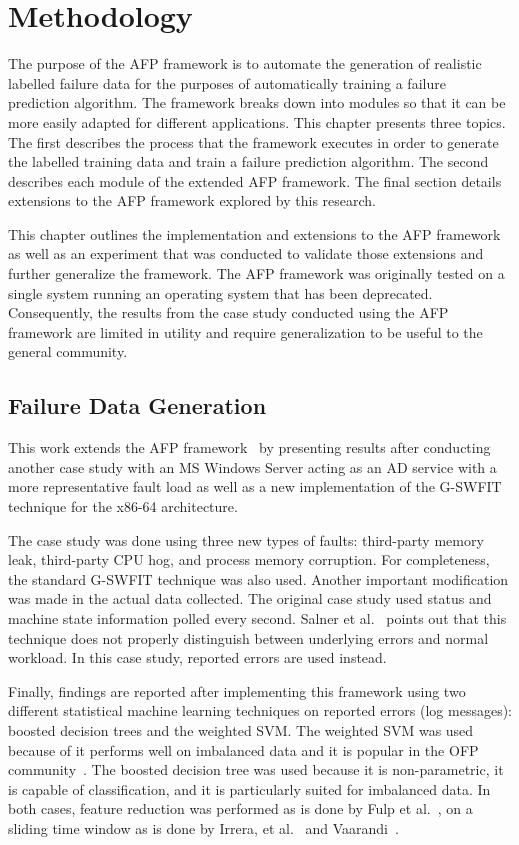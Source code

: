 \chapter{Methodology} \label{chapter3}
The purpose of the \ac{AFP} framework is to automate the generation of
realistic labelled failure data for the purposes of automatically training a
failure prediction algorithm.  The framework breaks down into modules so that
it can be more easily adapted for different applications.  This chapter
presents three topics.  The first describes the process that the framework
executes in order to generate the labelled training data and train a failure
prediction algorithm.  The second describes each module of the extended
\ac{AFP} framework.  The final section details extensions to the \ac{AFP}
framework explored by this research.

This chapter outlines the implementation and extensions to the \ac{AFP}
framework~\cite{irrera2015} as well as an experiment that was conducted to
validate those extensions and further generalize the framework.  The \ac{AFP}
framework was originally tested on a single system running an operating system
that has been deprecated.  Consequently, the results from the case study
conducted using the \ac{AFP} framework are limited in utility and require
generalization to be useful to the general community.

\section{Failure Data Generation} \label{sec:generation}
This work extends the \ac{AFP} framework~\cite{irrera2015} by presenting
results after conducting another case study with an \ac{MS} Windows Server
acting as an \ac{AD} service with a more representative fault load as well as a
new implementation of the \ac{G-SWFIT} technique for the x86-64 architecture.

The case study was done using three new types of faults: third-party memory
leak, third-party \ac{CPU} hog, and process memory corruption.  For
completeness, the standard \ac{G-SWFIT} technique was also used.  Another
important modification was made in the actual data collected.  The original
case study used status and machine state information polled every second.
Salner et al.~\cite{salfnerSurvey} points out that this technique does not
properly distinguish between underlying errors and normal workload.  In this
case study, reported errors are used instead.

Finally, findings are reported after implementing this framework using two
different statistical machine learning techniques on reported errors (log
messages): boosted decision trees and the weighted \ac{SVM}.  The weighted
\ac{SVM} was used because of it performs well on imbalanced data and it is
popular in the \ac{OFP} community~\cite{salfnerSurvey}.  The boosted decision
tree was used because it is non-parametric, it is capable of classification,
and it is particularly suited for imbalanced data.  In both cases, feature
reduction was performed as is done by Fulp et al.~\cite{fulp2008}, on a sliding
time window as is done by Irrera, et al.~\cite{irrera2013a} and
Vaarandi~\cite{vaarandi2002}.

